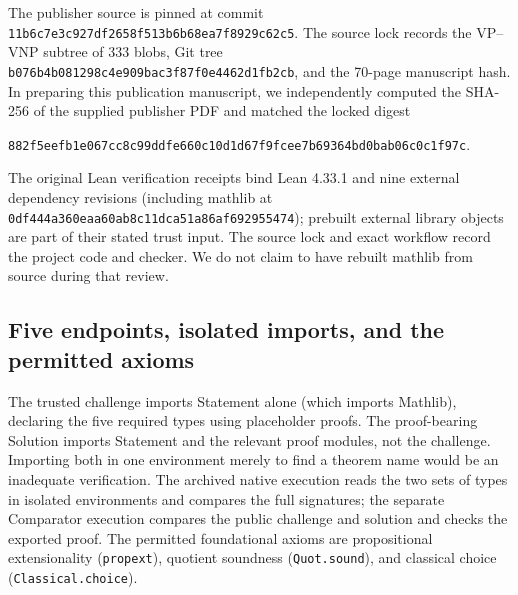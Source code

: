 \documentclass[11pt,letterpaper]{article}
\theoremstyle{definition}\newtheorem{definition}[theorem]{Definition}\newtheorem{example}[theorem]{Example}
\theoremstyle{remark}\newtheorem{remark}[theorem]{Remark}
\begin{document}
The publisher source is pinned at commit \nolinkurl{11b6c7e3c927df2658f513b6b68ea7f8929c62c5}. The source lock records the VP--VNP subtree of 333 blobs, Git tree \nolinkurl{b076b4b081298c4e909bac3f87f0e4462d1fb2cb}, and the 70-page manuscript hash. In preparing this publication manuscript, we independently computed the SHA-256 of the supplied publisher PDF and matched the locked digest
\begin{center}\small\nolinkurl{882f5eefb1e067cc8c99ddfe660c10d1d67f9fcee7b69364bd0bab06c0c1f97c}.\end{center}
The original Lean verification receipts bind Lean 4.33.1 and nine external dependency revisions (including mathlib at \nolinkurl{0df444a360eaa60ab8c11dca51a86af692955474}); prebuilt external library objects are part of their stated trust input. The source lock and exact workflow record the project code and checker. We do not claim to have rebuilt mathlib from source during that review.

\subsection{Five endpoints, isolated imports, and the permitted axioms}
The trusted challenge imports Statement alone (which imports Mathlib), declaring the five required types using placeholder proofs. The proof-bearing Solution imports Statement and the relevant proof modules, not the challenge. Importing both in one environment merely to find a theorem name would be an inadequate verification. The archived native execution reads the two sets of types in isolated environments and compares the full signatures; the separate Comparator execution compares the public challenge and solution and checks the exported proof. The permitted foundational axioms are propositional extensionality (\texttt{propext}), quotient soundness (\texttt{Quot.sound}), and classical choice (\texttt{Classical.choice}).
\end{document}
